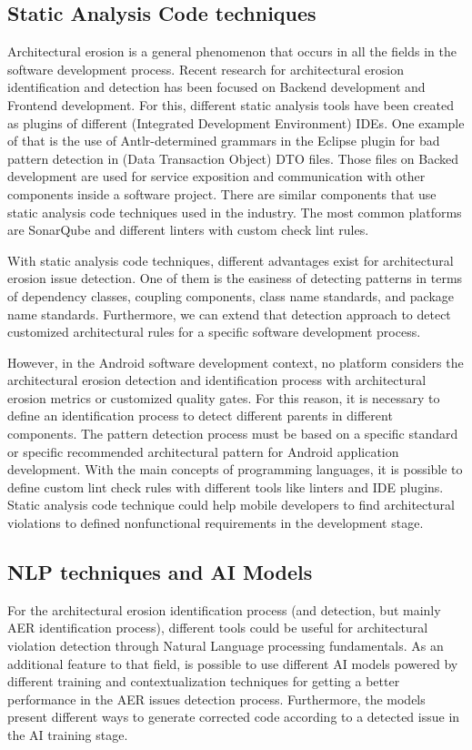 \subsection{Static Analysis Code techniques}
Architectural erosion is a general phenomenon that occurs in all the fields in the software development process. Recent research for architectural erosion identification and detection has been focused on Backend development and Frontend development. For this, different static analysis tools have been created as plugins of different  (Integrated Development Environment) IDEs. One example of that is the use of Antlr-determined grammars in the Eclipse plugin for bad pattern detection in (Data Transaction Object) DTO files. Those files on Backed development are used for service exposition and communication with other components inside a software project.
There are similar components that use static analysis code techniques used in the industry. The most common platforms are SonarQube and different linters with custom check lint rules.

With static analysis code techniques, different advantages exist for architectural erosion issue detection. One of them is the easiness of detecting patterns in terms of dependency classes, coupling components, class name standards, and package name standards. Furthermore, we can extend that detection approach to detect customized architectural rules for a specific software development process.\cite{master-thesis-aer-backend}

However, in the Android software development context, no platform considers the architectural erosion detection and identification process with architectural erosion metrics or customized quality gates. For this reason, it is necessary to define an identification process to detect different parents in different components. The pattern detection process must be based on a specific standard or specific recommended architectural pattern for Android application development. With the main concepts of programming languages, it is possible to define custom lint check rules with different tools like linters and IDE plugins. Static analysis code technique could help mobile developers to find architectural violations to defined nonfunctional requirements in the development stage.


\subsection{NLP techniques and AI Models}
For the architectural erosion identification process (and detection, but mainly AER identification process), different tools could be useful for architectural violation detection through Natural Language processing fundamentals. As an additional feature to that field, is possible to use different AI models powered by different training and contextualization techniques for getting a better performance in the AER issues detection process. Furthermore, the models present different ways to generate corrected code according to a detected issue in the AI training stage.


